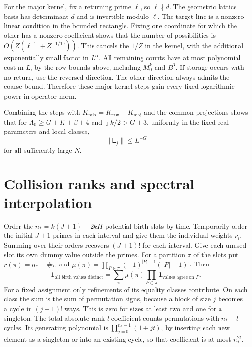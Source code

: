 \documentclass[11pt]{amsart}
\numberwithin{equation}{section}
\theoremstyle{remark}
\begin{document}
For the major kernel, fix a returning prime $\ell$, so $\ell\nmid d$.
The geometric lattice basis has determinant $d$ and is invertible
modulo $\ell$. The target line is a nonzero linear condition in
the bounded rectangle. Fixing one coordinate for which the other
has a nonzero coefficient shows that the number of possibilities
is $O(Z(\ell^{-1}+Z^{-1/10}))$. This cancels the $1/Z$ in the
kernel, with the additional exponentially small factor in $L^\alpha$.
All remaining counts have at most polynomial cost in $L$, by the
row bounds above, including $M_0^k$ and $B^3$. If storage occurs
with no return, use the reversed direction. The other direction
always admits the coarse bound. Therefore these major-kernel steps
gain every fixed logarithmic power in operator norm.

Combining the steps with $K_{\mathrm{min}}=K_{\mathrm{raw}}-K_{\mathrm{maj}}$
and the common projections shows that for
$A_0\ge G+K+\beta+4$ and $\jmath k/2>G+3$, uniformly in the fixed
real parameters and local classes,
\begin{equation}\label{eq:stepnorm}
 \|\mathsf E_j\|\le L^{-G}
\end{equation}
for all sufficiently large $N$.

\section{Collision ranks and spectral interpolation}\label{sec:collision}

Order the $n_*=k(J+1)+2kH$ potential birth slots by time. Temporarily
order the initial $J+1$ primes in each interval and give them the
individual weights $\nu_i$. Summing over their orders recovers
$(J+1)!$ for each interval. Give each unused slot its own dummy value
outside the primes. For a partition $\pi$ of the slots put
$r(\pi)=n_*-\#\pi$ and
$\mu(\pi)=\prod_{P\in\pi}(-1)^{|P|-1}(|P|-1)!$. Then
\begin{equation}\label{eq:partitionmobius}
 \mathbf1_{\text{all birth values distinct}}
 =\sum_\pi \mu(\pi)\prod_{P\in\pi}
       \mathbf1_{\text{values agree on }P}.
\end{equation}
For a fixed assignment only refinements of its equality classes
contribute. On each class the sum is the sum of permutation signs,
because a block of size $j$ becomes a cycle in $(j-1)!$ ways. This
is zero for sizes at least two and one for a singleton. The total
absolute rank-$l$ coefficient counts permutations with $n_*-l$
cycles. Its generating polynomial is $\prod_{j=0}^{n_*-1}(1+jt)$,
by inserting each new element as a singleton or into an existing
cycle, so that coefficient is at most $n_*^{2l}$.
\end{document}

